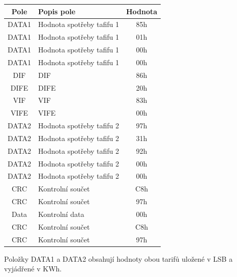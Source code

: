 \begin{table}[!ht]
\centering
\begin{tabular}{|c|l|c|}
\hline
\textbf{Pole}      & \textbf{Popis pole}            & \textbf{Hodnota} \\ \hline
DATA1 & Hodnota spotřeby tafifu 1 & 85h \\ \hline
DATA1 & Hodnota spotřeby tafifu 1 & 01h \\ \hline
DATA1 & Hodnota spotřeby tafifu 1 & 00h \\ \hline
DATA1 & Hodnota spotřeby tafifu 1 & 00h \\ \hline
DIF & DIF & 86h \\ \hline
DIFE & DIFE & 20h \\ \hline
VIF & VIF & 83h \\ \hline
VIFE & VIFE & 00h \\ \hline
DATA2 & Hodnota spotřeby tafifu 2 & 97h \\ \hline
DATA2 & Hodnota spotřeby tafifu 2 & 31h \\ \hline
DATA2 & Hodnota spotřeby tafifu 2 & 92h \\ \hline
DATA2 & Hodnota spotřeby tafifu 2 & 00h \\ \hline
DATA2 & Hodnota spotřeby tafifu 2 & 00h \\ \hline
CRC & Kontrolní součet & C8h \\ \hline
CRC & Kontrolní součet & 97h \\ \hline
Data & Kontrolní data & 00h \\ \hline
CRC & Kontrolní součet & C8h \\ \hline
CRC & Kontrolní součet & 97h \\ \hline \hline
\end{tabular}
\end{table}

\newpage

\vspace{+10pt}	

Položky DATA1 a DATA2 obsahují hodnoty obou tarifů uložené v LSB a vyjádřené v KWh.

